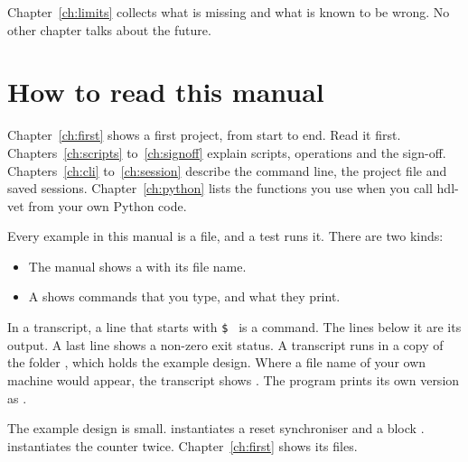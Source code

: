 Chapter~\ref{ch:limits} collects what is missing and what is known to be wrong.
No other chapter talks about the future.

\section{How to read this manual}

Chapter~\ref{ch:first} shows a first project, from start to end.
Read it first. Chapters~\ref{ch:scripts} to~\ref{ch:signoff} explain scripts,
operations and the sign-off. Chapters~\ref{ch:cli} to~\ref{ch:session} describe
the command line, the project file and saved sessions. Chapter~\ref{ch:python}
lists the functions you use when you call hdl-vet from your own Python code.

Every example in this manual is a file, and a test runs it. There are two kinds:

\begin{itemize}
\item The manual shows a  with its file name.
\item A  shows commands that you type, and what they print.
\end{itemize}

In a transcript, a line that starts with
\texttt{\$ } is a command. The lines below it are its output. A last line
 shows a non-zero exit status.
A transcript runs in a copy of the folder , which holds the
example design. Where a file name of your own machine would appear, the transcript
shows . The program prints its own version as
.

The example design is small.  instantiates a reset synchroniser
 and a block .  instantiates
the counter  twice. Chapter~\ref{ch:first} shows its files.
